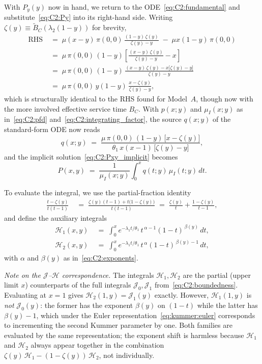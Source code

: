 With $P_y(y)$ now in hand, we return to the ODE~\eqref{eq:C2:fundamental} and substitute~\eqref{eq:C2:Py} into its right-hand side. Writing $\zeta(y) \equiv \widetilde{B}_C(\lambda_2(1-y))$ for brevity,
\begin{align*}
    \text{RHS}
    &\;=\; \mu(x-y)\,\pi(0,0)\,\frac{(1-y)\,\zeta(y)}{\zeta(y) - y} \;-\; \mu x(1-y)\,\pi(0,0) \\
    &\;=\; \mu\,\pi(0,0)\,(1-y)\!\left[\frac{(x-y)\,\zeta(y)}{\zeta(y) - y} - x\right] \\
    &\;=\; \mu\,\pi(0,0)\,(1-y)\,\frac{(x-y)\,\zeta(y) - x\bigl[\zeta(y) - y\bigr]}{\zeta(y) - y} \\
    &\;=\; \mu\,\pi(0,0)\,y(1-y)\,\frac{x - \zeta(y)}{\zeta(y) - y},
\end{align*}
which is structurally identical to the RHS found for Model~$A$, though now with the more involved effective service time $B_C$. With $p(x;y)$ and $\mu_I(x;y)$ as in~\eqref{eq:C2:pfd} and~\eqref{eq:C2:integrating_factor}, the source $q(x;y)$ of the standard-form ODE now reads
\begin{equation}
    q(x;y) \;=\; \frac{\mu\,\pi(0,0)\,(1-y)\,\bigl[x-\zeta(y)\bigr]}{\theta_1\,x(x-1)\,\bigl[\zeta(y)-y\bigr]},
\end{equation}
and the implicit solution~\eqref{eq:C2:Pxy_implicit} becomes
\begin{equation}
    P(x,y) \;=\; \frac{1}{\mu_I(x;y)} \int_0^x q(t;y)\,\mu_I(t;y)\,dt.
\end{equation}

To evaluate the integral, we use the partial-fraction identity
\begin{align*}
    \frac{t-\zeta(y)}{t(t-1)}
    &\;=\; \frac{\zeta(y)(t-1) + t\bigl(1-\zeta(y)\bigr)}{t(t-1)}
    \;=\; \frac{\zeta(y)}{t} + \frac{1-\zeta(y)}{t-1},
\end{align*}
and define the auxiliary integrals
\begin{align}
    \mathcal{H}_1(x,y) &\;=\; \int_0^x e^{-\lambda_1 t/\theta_1}\,t^{\,\alpha-1}(1-t)^{\,\beta(y)}\,dt, \label{eq:C2:I1} \\
    \mathcal{H}_2(x,y) &\;=\; \int_0^x e^{-\lambda_1 t/\theta_1}\,t^{\,\alpha}(1-t)^{\,\beta(y)-1}\,dt, \label{eq:C2:I2}
\end{align}
with $\alpha$ and $\beta(y)$ as in~\eqref{eq:C2:exponents}.

\textit{Note on the $\mathcal{J}$--$\mathcal{H}$ correspondence.}  The integrals $\mathcal{H}_1, \mathcal{H}_2$ are the partial (upper limit $x$) counterparts of the full integrals $\mathcal{J}_0, \mathcal{J}_1$ from~\eqref{eq:C2:boundedness}.  Evaluating at $x=1$ gives $\mathcal{H}_2(1,y)=\mathcal{J}_1(y)$ exactly.  However, $\mathcal{H}_1(1,y)$ is \emph{not} $\mathcal{J}_0(y)$: the former has the exponent $\beta(y)$ on $(1-t)$ while the latter has $\beta(y)-1$, which under the Euler representation~\eqref{eq:kummer:euler} corresponds to incrementing the second Kummer parameter by one.  Both families are evaluated by the same representation; the exponent shift is harmless because $\mathcal{H}_1$ and $\mathcal{H}_2$ always appear together in the combination $\zeta(y)\,\mathcal{H}_1 - (1-\zeta(y))\,\mathcal{H}_2$, not individually.

